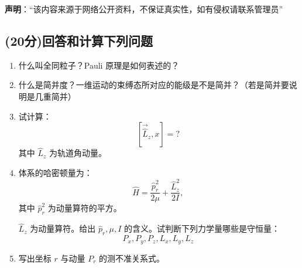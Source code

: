 
\textbf{声明}：“该内容来源于网络公开资料，不保证真实性，如有侵权请联系管理员”

\subsection{(20分)回答和计算下列问题}
\begin{enumerate}
    \item  什么叫全同粒子？Pauli 原理是如何表述的？

    \item  什么是简并度？一维运动的束缚态所对应的能级是不是简并？（若是简并要说明是几重简并）

    \item  试计算：
    \[    \left[\vec{\hat{L}}_z, x\right] = ?  ~\]
    其中 $\hat{L}_z$ 为轨道角动量。

    \item  体系的哈密顿量为：
    \[    \hat{H} = \frac{\hat{p}_r^2}{2\mu} + \frac{\hat{L}_z^2}{2I},  ~\]
    其中 $\hat{p}_r^2$ 为动量算符的平方。

    $\hat{L}_z$ 为动量算符。给出 $\hat{p}_r, \mu, I$ 的含义。试判断下列力学量哪些是守恒量：
    \[  P_x, P_y, P_z, L_x, L_y, L_z ~\]

    \item  写出坐标 $r$ 与动量 $P_r$ 的测不准关系式。
\end{enumerate}

